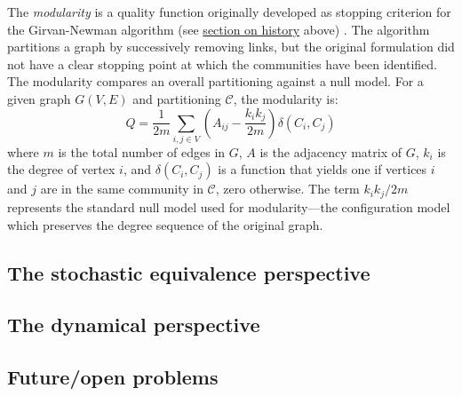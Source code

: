 The \emph{modularity} is a quality function originally developed as
stopping criterion for the Girvan-Newman algorithm (see
\protect\hyperlink{history}{section on history} above)
\autocites{newman_finding_2004}{newman_modularity_2006}. The algorithm
partitions a graph by successively removing links, but the original
formulation did not have a clear stopping point at which the communities
have been identified. The modularity compares an overall partitioning
against a null model. For a given graph \(G(V, E)\) and partitioning
\(\mathcal{C}\), the modularity is:
\[Q = \frac{1}{2m} \sum_{i,j \in V} \left(A_{ij} - \frac{k_i k_j}{2m}\right) \delta(C_i, C_j)\]
where \(m\) is the total number of edges in \(G\), \(A\) is the
adjacency matrix of \(G\), \(k_i\) is the degree of vertex \(i\), and
\(\delta(C_i, C_j)\) is a function that yields one if vertices \(i\) and
\(j\) are in the same community in \(\mathcal{C}\), zero otherwise. The
term \(k_i k_j / 2m\) represents the standard null model used for
modularity---the configuration model which preserves the degree sequence
of the original graph.

\hypertarget{the-stochastic-equivalence-perspective}{\subsection{The
stochastic equivalence
perspective}\label{the-stochastic-equivalence-perspective}}

\hypertarget{the-dynamical-perspective}{\subsection{The dynamical
perspective}\label{the-dynamical-perspective}}

\subsection{Future/open problems}\label{futureopen-problems}

